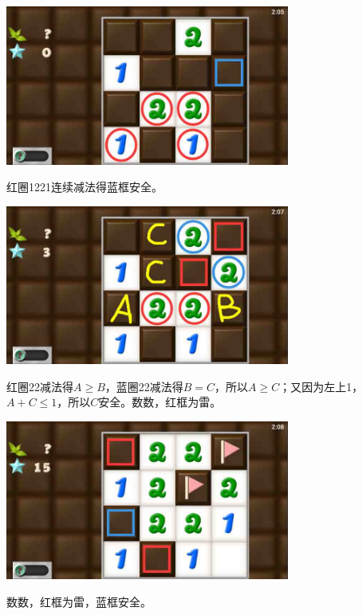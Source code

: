 \subsection{} %
\begin{center}
    \includegraphics[width=0.7\textwidth]{puzzlelow/140-1.jpg}
\end{center}
红圈1221连续减法得蓝框安全。
\begin{center}
    \includegraphics[width=0.7\textwidth]{puzzlelow/140-2.jpg}
\end{center}
红圈22减法得$A\ge B$，蓝圈22减法得$B=C$，所以$A\ge C$；又因为左上1，$A+C\le 1$，所以$C$安全。数数，红框为雷。
\begin{center}
    \includegraphics[width=0.7\textwidth]{puzzlelow/140-3.jpg}
\end{center}
数数，红框为雷，蓝框安全。

